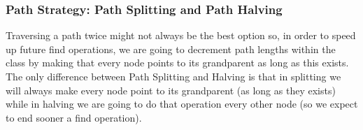 

\subsubsection{Path Strategy: Path Splitting and Path Halving}
Traversing a path twice might not always be the best option so, in order to speed up future find operations, we are going to decrement path lengths within the class by making that every node points to its grandparent as long as this exists. The only difference between Path Splitting and Halving is that in splitting we will always make every node point to its grandparent (as long as they exists) while in halving we are going to do that operation every other node (so we expect to end sooner a find operation).



